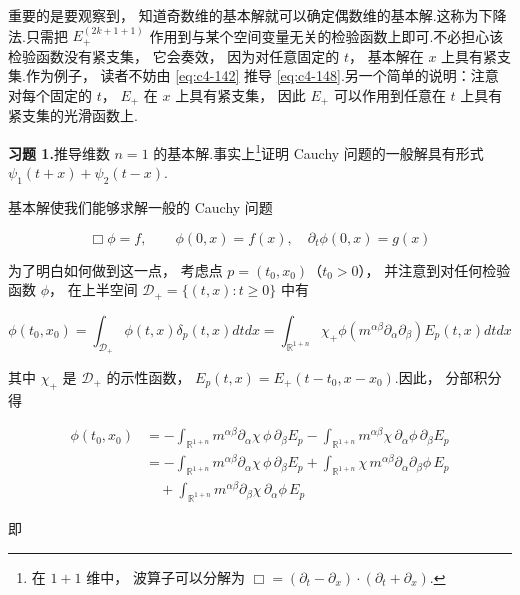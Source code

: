 重要的是要观察到， 知道奇数维的基本解就可以确定偶数维的基本解.这称为下降法.只需把 $E_{+}^{(2k+1+1)}$ 作用到与某个空间变量无关的检验函数上即可.不必担心该检验函数没有紧支集， 它会奏效， 因为对任意固定的 $t$， 基本解在 $x$ 上具有紧支集.作为例子， 读者不妨由 \eqref{eq:c4-142} 推导 \eqref{eq:c4-148}.另一个简单的说明：注意对每个固定的 $t$， $E_{+}$ 在 $x$ 上具有紧支集， 因此 $E_{+}$ 可以作用到任意在 $t$ 上具有紧支集的光滑函数上.

\noindent\textbf{习题 1.}\quad 推导维数 $n = 1$ 的基本解.事实上\footnote{在 $1+1$ 维中， 波算子可以分解为 $\Box = (\partial_{t}-\partial_{x})\cdot(\partial_{t}+\partial_{x})$.}证明 Cauchy 问题的一般解具有形式 $\psi_{1}(t+x) + \psi_{2}(t-x)$.

基本解使我们能够求解一般的 Cauchy 问题

\begin{equation}
\Box\phi = f, \qquad \phi(0, x) = f(x), \quad \partial_{t}\phi(0, x) = g(x)\label{eq:c4-144}
\end{equation}

为了明白如何做到这一点， 考虑点 $p = (t_{0}, x_{0})$（$t_{0} > 0$）， 并注意到对任何检验函数 $\phi$， 在上半空间 $\mathcal{D}_{+} = \{(t, x): t \geq 0\}$ 中有

\[
\phi(t_{0}, x_{0}) = \int_{\mathcal{D}_{+}}\phi(t, x)\delta_{p}(t, x)dtdx = \int_{\mathbb{R}^{1+n}}\chi_{+}\phi\left(m^{\alpha\beta}\partial_{\alpha}\partial_{\beta}\right)E_{p}(t, x)dtdx
\]

其中 $\chi_{+}$ 是 $\mathcal{D}_{+}$ 的示性函数， $E_{p}(t, x) = E_{+}(t-t_{0}, x-x_{0})$.因此， 分部积分得

\[
\begin{aligned}
\phi(t_{0}, x_{0}) &= -\int_{\mathbb{R}^{1+n}}m^{\alpha\beta}\partial_{\alpha}\chi\, \phi\, \partial_{\beta}E_{p} - \int_{\mathbb{R}^{1+n}}m^{\alpha\beta}\chi\, \partial_{\alpha}\phi\, \partial_{\beta}E_{p} \\
&= -\int_{\mathbb{R}^{1+n}}m^{\alpha\beta}\partial_{\alpha}\chi\, \phi\, \partial_{\beta}E_{p} + \int_{\mathbb{R}^{1+n}}\chi\, m^{\alpha\beta}\partial_{\alpha}\partial_{\beta}\phi\, E_{p} \\
&\quad + \int_{\mathbb{R}^{1+n}}m^{\alpha\beta}\partial_{\beta}\chi\, \partial_{\alpha}\phi\, E_{p}
\end{aligned}
\]

即

